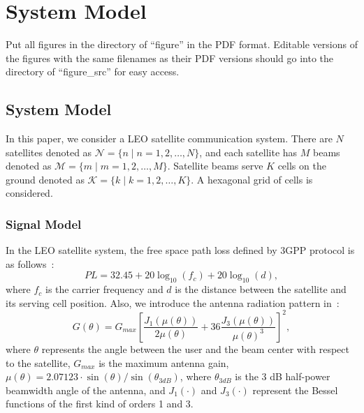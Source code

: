 \chapter{System Model}
\label{chap:model}

Put all figures in the directory of ``figure'' in the PDF format. Editable versions of
the figures with the same filenames as their PDF versions should go into the directory of 
``figure\_src'' for easy access.

\section{System Model}
In this paper, we consider a LEO satellite communication system. There are $N$ satellites denoted as $\mathcal{N} = \{n \mid n = 1, 2, \ldots, N\}$, and each satellite has $M$ beams denoted as $\mathcal{M} = \{m \mid m = 1, 2, \ldots, M\}$. Satellite beams serve $K$ cells on the ground denoted as $\mathcal{K} = \{k \mid k = 1, 2, \ldots, K\}$. A hexagonal grid of cells is considered.

\subsection{Signal Model}
In the LEO satellite system, the free space path loss defined by 3GPP protocol is as follows~\cite{38811}:
\begin{equation}
PL = 32.45 + 20\log_{10}(f_c) + 20\log_{10}(d),
\end{equation}
where $f_c$ is the carrier frequency and $d$ is the distance between the satellite and its serving cell position.
Also, we introduce the antenna radiation pattern in~\cite{Energy-Efficient}:
\begin{equation}
G(\theta) = G_{max} \left[ \frac{J_1\left(\mu(\theta)\right)}{2\mu(\theta)} 
+ 36 \frac{J_3\left(\mu(\theta)\right)}{\mu(\theta)^3} \right]^2,
\end{equation}
where $\theta$ represents the angle between the user and the beam center with respect to the satellite, $G_{max}$ is the maximum antenna gain, $\mu(\theta) = 2.07123\cdot \sin(\theta)/\sin(\theta_{3dB})$, where $\theta_{3dB}$ is the 3 dB half-power beamwidth angle of the antenna, and $J_1(\cdot)$ and $J_3(\cdot)$ represent the Bessel functions of the first kind of orders 1 and 3.

